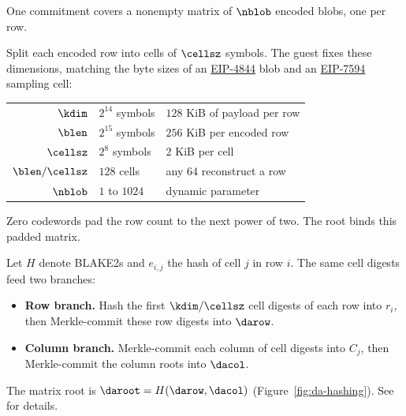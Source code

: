 One commitment covers a nonempty matrix of $\nblob$ encoded blobs, one per row.

Split each encoded row into cells of $\cellsz$ symbols. The guest fixes these dimensions, matching the byte sizes of an \href{https://eips.ethereum.org/EIPS/eip-4844}{EIP-4844} blob and an \href{https://eips.ethereum.org/EIPS/eip-7594}{EIP-7594} sampling cell:
\begin{center}
\begin{tabular}{@{}rll@{}}
\hline
$\kdim$ & $2^{14}$ symbols & $128$ KiB of payload per row\\
$\blen$ & $2^{15}$ symbols & $256$ KiB per encoded row\\
$\cellsz$ & $2^8$ symbols & $2$ KiB per cell\\
$\blen/\cellsz$ & $128$ cells & any $64$ reconstruct a row\\
$\nblob$ & $1$ to $1024$ & dynamic parameter\\
\hline
\end{tabular}
\end{center}
Zero codewords pad the row count to the next power of two. The root binds this padded matrix.

Let $H$ denote BLAKE2s and $e_{i,j}$ the hash of cell $j$ in row $i$. The same cell digests feed two branches:
\begin{itemize}[itemsep=1pt,topsep=3pt]
\item \textbf{Row branch.} Hash the first $\kdim/\cellsz$ cell digests of each row into $r_i$, then Merkle-commit these row digests into $\darow$.
\item \textbf{Column branch.} Merkle-commit each column of cell digests into $C_j$, then Merkle-commit the column roots into $\dacol$.
\end{itemize}
The matrix root is $\daroot=H(\darow,\dacol)$ (Figure~\ref{fig:da-hashing}). See \cite{LeanDA} for details.

